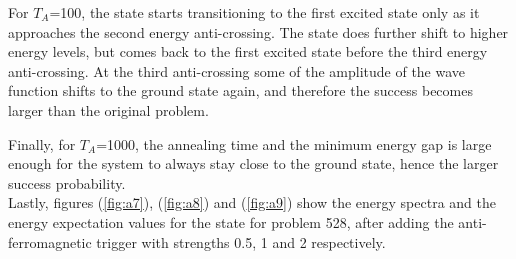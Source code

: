\documentclass[../main.tex]{subfiles}
\begin{document}
For $T_A$=100, the state starts transitioning to the first excited state only as it approaches the second energy anti-crossing. The state does further shift to higher energy levels, but comes back to the first excited state before the third energy anti-crossing. At the third anti-crossing some of the amplitude of the wave function shifts to the ground state again, and therefore the success becomes larger than the original problem. 


Finally, for $T_A$=1000, the annealing time and the minimum energy gap is large enough for the system to always stay close to the ground state, hence the larger success probability.\\

Lastly, figures (\ref{fig:a7}), (\ref{fig:a8}) and (\ref{fig:a9}) show the energy spectra and the energy expectation values for the state for problem 528, after adding the anti-ferromagnetic trigger with strengths 0.5, 1 and 2 respectively. 
\end{document}
